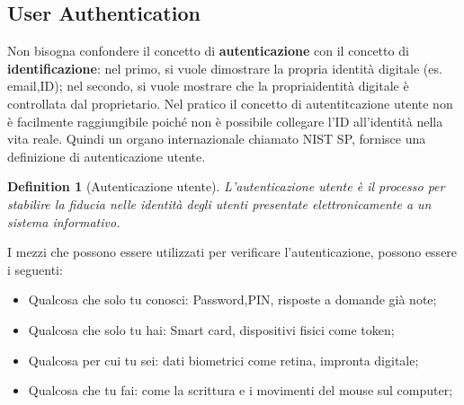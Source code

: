 \documentclass{article}
\newtheorem{definition}{Definition}[section]
\theoremstyle{remark}
\begin{document}
\subsection{User Authentication}
Non bisogna confondere il concetto di \textbf{autenticazione} con il concetto di \textbf{identificazione}: nel primo, si vuole dimostrare la propria identità digitale (es. email,ID); nel secondo, si vuole mostrare che la propriaidentità digitale è controllata dal proprietario.
Nel pratico il concetto di autentitcazione utente non è facilmente raggiungibile poiché non è possibile collegare l'ID all'identità nella vita reale. Quindi un organo internazionale chiamato NIST SP, fornisce una definizione di autenticazione utente.
\begin{definition}[Autenticazione utente]
	L'autenticazione utente è il processo per stabilire la fiducia nelle identità degli utenti presentate elettronicamente a un sistema informativo.
\end{definition}
I mezzi che possono essere utilizzati per verificare l'autenticazione, possono essere i seguenti:
\begin{itemize}
	\item Qualcosa che solo tu conosci: Password,PIN, risposte a domande già note;
	\item Qualcosa che solo tu hai: Smart card, dispositivi fisici come token;
	\item Qualcosa per cui tu sei: dati biometrici come retina, impronta digitale;
	\item Qualcosa che tu fai: come la scrittura e i movimenti del mouse sul computer;
\end{itemize}
\end{document}
